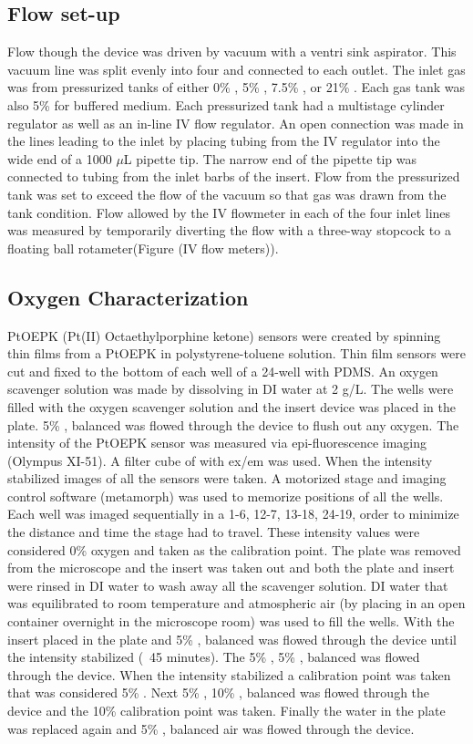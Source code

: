 \subsection{Flow set-up}
Flow though the device was driven by vacuum with a ventri sink aspirator.
This vacuum line was split evenly into four and connected to each outlet.
The inlet gas was from pressurized tanks of either 0\% , 5\% , 7.5\% , or 21\% .
Each gas tank was also 5\%  for  buffered medium.
Each pressurized tank had a multistage cylinder regulator as well as an in-line IV flow regulator.
An open connection was made in the lines leading to the inlet by placing tubing from the IV regulator into the wide end of a 1000 $\mu$L pipette tip.
The narrow end of the pipette tip was connected to tubing from the inlet barbs of the insert.
Flow from the pressurized tank was set to exceed the flow of the vacuum so that gas was drawn from the tank condition.
Flow allowed by the IV flowmeter in each of the four inlet lines was measured by temporarily diverting the flow with a three-way stopcock to a floating ball rotameter(Figure (IV flow meters)).

\subsection{Oxygen Characterization}
PtOEPK (Pt(II) Octaethylporphine ketone) sensors were created by spinning thin films from a PtOEPK in polystyrene-toluene solution.
Thin film sensors were cut and fixed to the bottom of each well of a 24-well with PDMS.
An oxygen scavenger solution was made by dissolving  in DI water at 2 g/L.
The wells were filled with the oxygen scavenger solution and the insert device was placed in the plate.
5\% , balanced  was flowed through the device to flush out any oxygen.
The intensity of the PtOEPK sensor was measured via epi-fluorescence imaging (Olympus XI-51).
A filter cube of with ex/em was used.
When the intensity stabilized images of all the sensors were taken.
A motorized stage and imaging control software (metamorph) was used to memorize positions of all the wells.
Each well was imaged sequentially in a 1-6, 12-7, 13-18, 24-19, order to minimize the distance and time the stage had to travel.
These intensity values were considered 0\% oxygen and taken as the calibration point.
The plate was removed from the microscope and the insert was taken out and both the plate and insert were rinsed in DI water to wash away all the scavenger solution.
DI water that was equilibrated to room temperature and atmospheric air (by placing in an open container overnight in the microscope room) was used to fill the wells.
With the insert placed in the plate and 5\% , balanced  was flowed through the device until the intensity stabilized (~45 minutes).
The 5\% , 5\% , balanced  was flowed through the device.
When the intensity stabilized a calibration point was taken that was considered 5\% .
Next 5\% , 10\% , balanced  was flowed through the device and the 10\% calibration point was taken.
Finally the water in the plate was replaced again and 5\% , balanced air was flowed through the device.

